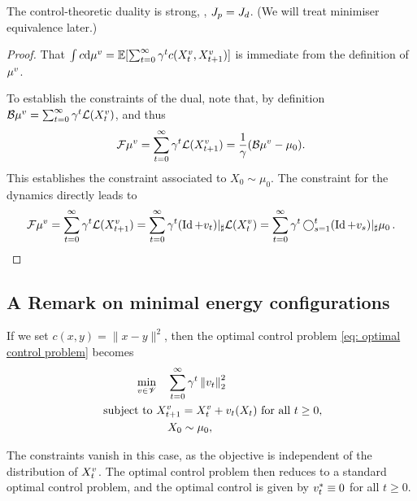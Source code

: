 \documentclass[twoside,10pt]{../jmlr}
\begin{document}
\begin{lemma}\label{lemma: control-theoretic duality}
    The control-theoretic duality is strong, \ie, $J_p=J_d$. (We will treat minimiser equivalence later.)
\end{lemma}

\begin{proof}
    That $\int c\mathrm{d} \mu^v = \mathbb{E}[\sum_{t=0}^{\infty} \gamma^t c(X_t^v, X_{t+1}^v)]$ is immediate from the definition of $\mu^v$. 
    
    To establish the constraints of the dual, note that, by definition $\mathcal{B}\mu^v=\sum_{t=0}^{\infty} \gamma^t \mathcal{L}(X_{t}^v)$, and thus
    \begin{align}
        \mathcal{F}\mu^v=\sum_{t=0}^{\infty} \gamma^t \mathcal{L}(X_{t+1}^v)= \frac1\gamma (\mathcal{B}\mu^v - \mu_0). 
    \end{align}
    This establishes the constraint associated to $X_0\sim\mu_0$. The constraint for the dynamics directly leads to 
    \begin{align}
        \mathcal{F}\mu^v=\sum_{t=0}^{\infty} \gamma^t \mathcal{L}(X_{t+1}^v)= \sum_{t=0}^{\infty} \gamma^t (\operatorname{Id}+v_t)\vert_\sharp\mathcal{L}(X_t^v) = \sum_{t=0}^{\infty} \gamma^t \operatorname{\bigcirc}_{s=1}^t(\operatorname{Id}+v_s)\vert_\sharp \mu_0\,.
    \end{align}
\end{proof}

\subsection{A Remark on minimal energy configurations}

If we set $c(x,y)=\|x-y\|^2$, then the optimal control problem \eqref{eq: optimal control problem} becomes 
\begin{align}
    \min_{v\in\mathscr{V}}&\quad \sum_{t=0}^\infty \gamma^t \left\lVert v_t\right\rVert^2_2\\
    \mbox{ subject to }& X_{t+1}^v=X_t^v+ v_t(X_t) \mbox{ for all } t\ge 0,\notag \\
    &\quad X_0\sim\mu_0,\notag
\end{align}

The constraints vanish in this case, as the objective is independent of the distribution of $X_t^v$. The optimal control problem then reduces to a standard optimal control problem, and the optimal control is given by $v^*_t\equiv 0$ for all $t\ge 0$.
\end{document}
